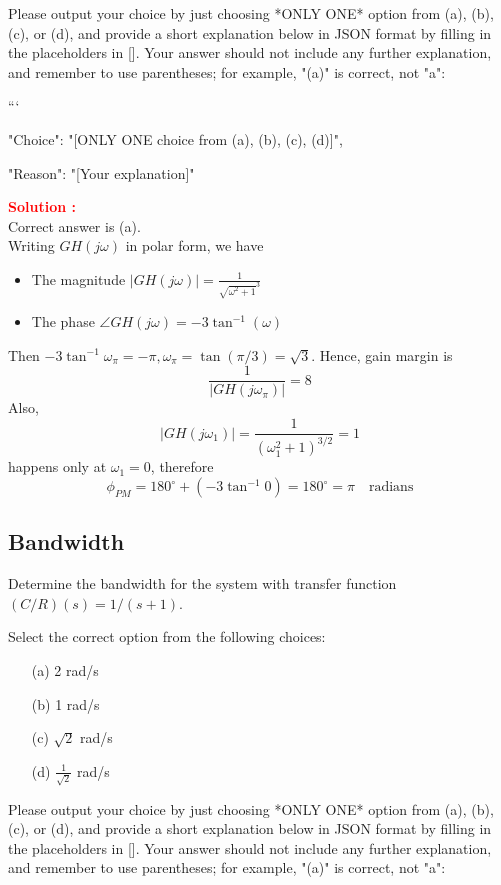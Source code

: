 \documentclass[12pt]{article}
\begin{document}
Please output your choice by just choosing *ONLY ONE* option from (a), (b), (c), or (d), and provide a short explanation below in JSON format by filling in the placeholders in []. Your answer should not include any further explanation, and remember to use parentheses; for example, "(a)" is correct, not "a": 

```
{

"Choice": "[ONLY ONE choice from (a), (b), (c), (d)]",

"Reason": "[Your explanation]"

}


\textbf{\textcolor{red}{Solution :}} \\
Correct answer is (a).\\
Writing $GH(j\omega)$ in polar form, we have
\begin{itemize}
    \item The magnitude $|GH(j\omega)| = \frac{1}{\sqrt{\omega^2 + 1}^3}$
    \item The phase $\angle GH(j\omega) = -3 \tan^{-1}(\omega)$
\end{itemize}
Then \(-3 \tan^{-1} \omega_\pi = -\pi, \omega_\pi = \tan(\pi/3) = \sqrt{3}\). Hence, gain margin is
\[ \frac{1}{|GH(j\omega_\pi)|} = 8\]
Also,
\[|GH(j\omega_1)| = \frac{1}{(\omega_1^2+1)^{3/2}} = 1\]
happens only at \(\omega_1  = 0\), therefore
\[\phi_{PM} = 180^\circ + (-3\tan^{-1} 0) = 180^\circ = \pi \quad  \text{radians}\]
\clearpage

\subsection{Bandwidth}

Determine the bandwidth for the system with transfer function \((C/R)(s) = 1/(s+1)\).


Select the correct option from the following choices:
\begin{enumerate}
    \item [(a)] 2 rad/s
    \item [(b)] 1 rad/s
    \item [(c)] \(\sqrt{2}\) rad/s
    \item [(d)]  \(\frac{1}{\sqrt{2}}\) rad/s
\end{enumerate}

Please output your choice by just choosing *ONLY ONE* option from (a), (b), (c), or (d), and provide a short explanation below in JSON format by filling in the placeholders in []. Your answer should not include any further explanation, and remember to use parentheses; for example, "(a)" is correct, not "a": 
\end{document}
